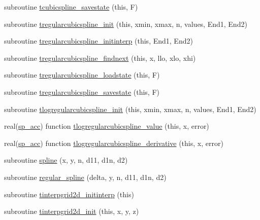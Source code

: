 \begin{DoxyCompactItemize}
\item 
subroutine \mbox{\hyperlink{namespaceinterpolation_a45a1312a778961c9e5f843e2602c83ac}{tcubicspline\+\_\+savestate}} (this, F)
\item 
subroutine \mbox{\hyperlink{namespaceinterpolation_ad48c755482d305cc69ce002d8d57eb5e}{tregularcubicspline\+\_\+init}} (this, xmin, xmax, n, values, End1, End2)
\item 
subroutine \mbox{\hyperlink{namespaceinterpolation_a771257f70f21fe027a53de95c8e6454d}{tregularcubicspline\+\_\+initinterp}} (this, End1, End2)
\item 
subroutine \mbox{\hyperlink{namespaceinterpolation_a48194743476e43ec9aa03c02aab39655}{tregularcubicspline\+\_\+findnext}} (this, x, llo, xlo, xhi)
\item 
subroutine \mbox{\hyperlink{namespaceinterpolation_a5fa8f1fc11b994b0bae323cbe4bd5512}{tregularcubicspline\+\_\+loadstate}} (this, F)
\item 
subroutine \mbox{\hyperlink{namespaceinterpolation_a387cdc39d5949cc2aa2e5c6f483ea76c}{tregularcubicspline\+\_\+savestate}} (this, F)
\item 
subroutine \mbox{\hyperlink{namespaceinterpolation_aa2be88d51742c20455f21df95d3cb51d}{tlogregularcubicspline\+\_\+init}} (this, xmin, xmax, n, values, End1, End2)
\item 
real(\mbox{\hyperlink{namespaceinterpolation_af72aa9a05feb8ef90b2d26e4a013abf3}{sp\+\_\+acc}}) function \mbox{\hyperlink{namespaceinterpolation_a7268d0f57d8b03233c2f2b56ac6fdc52}{tlogregularcubicspline\+\_\+value}} (this, x, error)
\item 
real(\mbox{\hyperlink{namespaceinterpolation_af72aa9a05feb8ef90b2d26e4a013abf3}{sp\+\_\+acc}}) function \mbox{\hyperlink{namespaceinterpolation_ac23315fe4c5bc33742774f63869508b4}{tlogregularcubicspline\+\_\+derivative}} (this, x, error)
\item 
subroutine \mbox{\hyperlink{namespaceinterpolation_a5701eba38ba9b96476493a39580ebe38}{spline}} (x, y, n, d11, d1n, d2)
\item 
subroutine \mbox{\hyperlink{namespaceinterpolation_a2864cd829f018329811e906e0b258b6c}{regular\+\_\+spline}} (delta, y, n, d11, d1n, d2)
\item 
subroutine \mbox{\hyperlink{namespaceinterpolation_a7bde4bd21a717432ca0927ec3f2393ee}{tinterpgrid2d\+\_\+initinterp}} (this)
\item 
subroutine \mbox{\hyperlink{namespaceinterpolation_af4593e1e65b9137fa491cdaf9d0682a8}{tinterpgrid2d\+\_\+init}} (this, x, y, z)
\item 

\end{DoxyCompactItemize}
